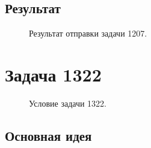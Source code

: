 \documentclass[a5paper, 10pt]{article}
\theoremstyle{definition}
\theoremstyle{plain}
\theoremstyle{remark}
\begin{document}
\subsection{Результат}
\begin{figure}[h]
\caption{Результат отправки задачи 1207.}
\end{figure}


\newpage

\section{Задача 1322}

\begin{figure}[h]
\caption{Условие задачи 1322.}
\end{figure}

\subsection{Основная идея}
\end{document}
